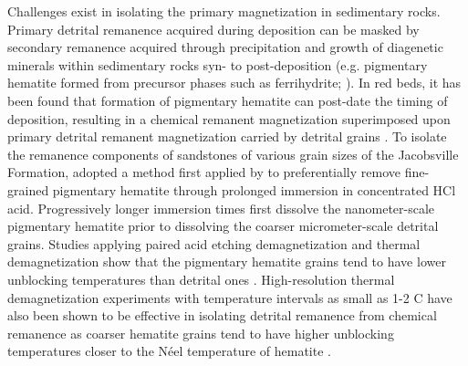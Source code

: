 Challenges exist in isolating the primary magnetization in sedimentary rocks. Primary detrital remanence acquired during deposition can be masked by secondary remanence acquired through precipitation and growth of diagenetic minerals within sedimentary rocks syn- to post-deposition (e.g. pigmentary hematite formed from precursor phases such as ferrihydrite; ). In red beds, it has been found that formation of pigmentary hematite can post-date the timing of deposition, resulting in a chemical remanent magnetization superimposed upon primary detrital remanent magnetization carried by detrital grains \cite{Collinson1974a, Tauxe1980a}. To isolate the remanence components of sandstones of various grain sizes of the Jacobsville Formation,  adopted a method first applied by  to preferentially remove fine-grained pigmentary hematite through prolonged immersion in concentrated HCl acid. Progressively longer immersion times first dissolve the nanometer-scale pigmentary hematite prior to dissolving the coarser micrometer-scale detrital grains. Studies applying paired acid etching demagnetization and thermal demagnetization show that the pigmentary hematite grains tend to have lower unblocking temperatures than detrital ones \cite{Tauxe1980a, Bilardello2010c}. High-resolution thermal demagnetization experiments with temperature intervals as small as 1-2 \textdegree C have also been shown to be effective in isolating detrital remanence from chemical remanence as coarser hematite grains tend to have higher unblocking temperatures closer to the N\'eel temperature of hematite \cite{Jiang2015a,Swanson-Hysell2019b}. 

